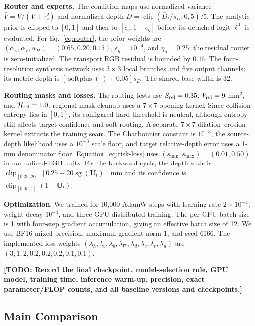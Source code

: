 \documentclass[letterpaper,10pt,conference]{ieeeconf}
\newcommand{\todo}[1]{\textcolor{todoRed}{\textbf{[TODO: #1]}}}
\newcommand{\U}{\mathbf{U}}
\begin{document}
\noindent\textbf{Router and experts.}
The condition maps use normalized variance
$\bar V=V/(V+\tau_z^2)$ and normalized depth
$\widetilde D=\operatorname{clip}(\bar D_t/s_D,0,5)/5$. The analytic prior is
clipped to $[0,1]$ and then to $[\epsilon_g,1-\epsilon_g]$ before its detached
logit $\ell^0$ is evaluated. For Eq.~\eqref{eq:router}, the prior weights are
$(\alpha_\kappa,\alpha_V,\alpha_H)=(0.65,0.20,0.15)$,
$\epsilon_g=10^{-4}$, and $\eta_g=0.25$; the residual router is
zero-initialized. The transport RGB residual is bounded by $0.15$. The
four-resolution synthesis network uses $3\times3$ local branches and five
output channels; its metric depth is
$[\operatorname{softplus}(\cdot)+0.05]s_D$. The shared base width is 32.

\noindent\textbf{Routing masks and losses.}
The routing tests use $S_{\rm rel}=0.35$, $V_{\rm rel}=9$ mm$^2$, and
$\mathcal H_{\rm rel}=1.0$; regional-mask cleanup uses a $7\times7$ opening kernel. Since
collision entropy lies in $[0,1]$, its configured hard threshold is neutral,
although entropy still affects target confidence and soft routing. A separate
$7\times7$ dilation--erosion kernel extracts the training seam. The
Charbonnier constant is $10^{-3}$, the source-depth likelihood uses a
$10^{-3}$ scale floor, and target relative-depth error uses a 1-mm denominator
floor. Equation~\eqref{eq:risk-loss} uses
$(s_{\min},s_{\max})=(0.01,0.50)$ in normalized-RGB units. For the backward
cycle, the depth scale is
$\operatorname{clip}_{[0.25,20]}[0.25+20\operatorname{sg}(\U_t)]$ mm and its
confidence is $\operatorname{clip}_{[0.05,1]}(1-\U_t)$.

\noindent\textbf{Optimization.}
We trained for 10,000 AdamW steps with learning rate
$2\times10^{-4}$, weight decay $10^{-4}$, and three-GPU distributed training.
The per-GPU batch size is 1 with four-step gradient accumulation, giving an
effective batch size of 12. We use BF16 mixed precision, maximum gradient norm
1, and seed 6666. The implemented loss weights
$(\lambda_h,\lambda_v,\lambda_b,\lambda_\nabla,\lambda_d,\lambda_c,
\lambda_r,\lambda_u)$ are $(3,1,2,0.2,0.2,0.2,0.1,0.1)$.

\todo{Record the final checkpoint, model-selection rule, GPU model, training
time, inference warm-up, precision, exact parameter/FLOP counts, and all
baseline versions and checkpoints.}

\subsection{Main Comparison}
\end{document}
